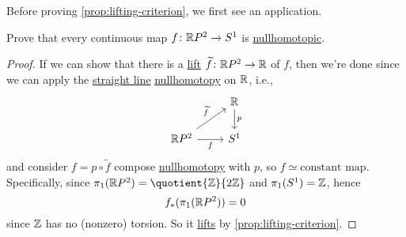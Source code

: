 Before proving \autoref{prop:lifting-criterion}, we first see an application.
\begin{eg}
	Prove that every continuous map \(f\colon \mathbb{\MakeUppercase{r}} P^{2}\to S^1\) is \hyperref[def:nullhomotopic]{nullhomotopic}.
	\begin{proof}
		If we can show that there is a \hyperref[prop:homotopy-lifting-property]{lift} \(\widetilde{f} \colon \mathbb{\MakeUppercase{r}} P^{2}\to \mathbb{\MakeUppercase{r}}\) of \(f\),
		then we're done since we can apply the \hyperref[eg:lec1:straight-line-homotopy]{straight line} \hyperref[def:nullhomotopic]{nullhomotopy}
		on \(\mathbb{\MakeUppercase{r}} \), i.e.,
		\[
			\begin{tikzcd}
				& {\mathbb{R}} \\
				{\mathbb{R}P^2} & {S^1}
				\arrow["f"', from=2-1, to=2-2]
				\arrow["{\widetilde{f}}", from=2-1, to=1-2]
				\arrow["p", from=1-2, to=2-2]
			\end{tikzcd}
		\]
		and consider \(f = p \circ \widetilde{f} \) compose \hyperref[def:nullhomotopic]{nullhomotopy} with \(p\), so \(f\simeq \text{constant map} \).
		Specifically, since \(\pi _1(\mathbb{\MakeUppercase{r}} P^{2}) = \quotient{\mathbb{\MakeUppercase{z}}}{2 \mathbb{\MakeUppercase{z}}}\) and
		\(\pi _1(S^1) = \mathbb{\MakeUppercase{z}} \), hence
		\[
			f_\ast (\pi _1(\mathbb{\MakeUppercase{r}} P^{2} )) = 0
		\]
		since \(\mathbb{\MakeUppercase{z}} \) has no (nonzero) torsion. So it \hyperref[prop:homotopy-lifting-property]{lifts} by
		\autoref{prop:lifting-criterion}.
	\end{proof}
\end{eg}


